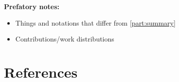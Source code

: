 
\graphicspath{{publications/pub1/}}

\begin{abstract}

\end{abstract}

\textbf{Prefatory notes:}
\begin{itemize}
    \item Things and notations that differ from \cref{part:summary}
    \item Contributions/work distributions
\end{itemize}



\begin{subappendices}
  \setcounter{section}{0}
  \renewcommand\thesection{\thechapter.\Alph{section}} %

  
  

  
\end{subappendices}

\section*{References}
{}
\newrefcontext[sorting=ynt]{}


\newrefcontext[sorting=appearance-date-name]{}
\printbibliography[heading=none,notcategory=thesispapers]{}

